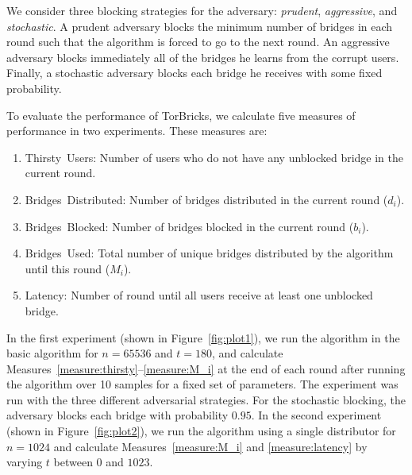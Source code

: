 \documentclass[USenglish,oneside,twocolumn]{article}
\newcommand{\bricks}{}
\def\bricks/{\textsf{\sfsize \mbox{TorBricks}}}
\newcommand{\sfsize}{\fontsize{0.68\baselineskip}{0.68\baselineskip}\selectfont}
\newcommand{\sans}[1]{\textsf{\sfsize \mbox{#1}}}
\begin{document}
We consider three blocking strategies for the adversary: \emph{prudent}, \emph{aggressive}, and \emph{stochastic}. A prudent adversary blocks the minimum number of bridges in each round such that the algorithm is forced to go to the next round. An aggressive adversary blocks immediately all of the bridges he learns from the corrupt users. Finally, a stochastic adversary blocks each bridge he receives with some fixed probability.

To evaluate the performance of \bricks/, we calculate five measures of performance in two experiments. These measures are:

\begin{enumerate}[itemsep=0.4em, topsep=0.55em]
	\item \sans{Thirsty Users:} Number of users who do not have any unblocked bridge in the current round. \label{measure:thirsty}
	\item \sans{Bridges Distributed:} Number of bridges distributed in the current round ($d_i$). \label{measure:d_i}
	\item \sans{Bridges Blocked:} Number of bridges blocked in the current round ($b_i$). \label{measure:b_i}
	\item \sans{Bridges Used:} Total number of unique bridges distributed by the algorithm until this round ($M_i$). \label{measure:M_i}
	\item \sans{Latency:} Number of round until all users receive at least one unblocked bridge. \label{measure:latency}
\end{enumerate}

In the first experiment (shown in Figure~\ref{fig:plot1}), we run the algorithm in the basic algorithm for ${n=65536}$ and ${t=180}$, and calculate Measures~\ref{measure:thirsty}--\ref{measure:M_i} at the end of each round after running the algorithm over 10 samples for a fixed set of parameters. The experiment was run with the three different adversarial strategies. For the stochastic blocking, the adversary blocks each bridge with probability $0.95$. %
In the second experiment (shown in Figure~\ref{fig:plot2}), we run the algorithm using a single distributor for ${n=1024}$ and calculate Measures~\ref{measure:M_i} and \ref{measure:latency} by varying $t$ between $0$ and $1023$.
\end{document}
